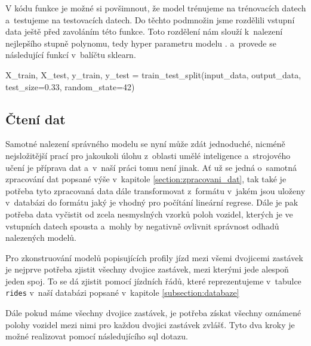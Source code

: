 \bigbreak

V kódu funkce je možné si povšimnout, že model trénujeme na trénovacích datech a~testujeme na testovacích datech. Do těchto podmnožin jsme rozdělili vstupní data ještě před zavoláním této funkce. Toto rozdělení nám slouží k~nalezení nejlepšího stupně polynomu, tedy hyper parametru modelu \citep[viz][Strana 365, validation set a~training set]{Ripley96}. a~provede se následující funkcí v~balíčtu sklearn.

\begin{code}[frame=none]
X_train, X_test, y_train, y_test =
  train_test_split(input_data,
    output_data, test_size=0.33, random_state=42)
\end{code}


\subsection{Čtení dat} \label{subsection:cteni_dat}

Samotné nalezení správného modelu se nyní může zdát jednoduché, nicméně nejsložitější prací pro jakoukoli úlohu z~oblasti umělé inteligence a~strojového učení je příprava dat a~v~naší práci tomu není jinak. Ať už se jedná o~samotná zpracování dat popsané výše v~kapitole \ref{section:zpracovani_dat}, tak také je potřeba tyto zpracovaná data dále transformovat z~formátu v~jakém jsou uloženy v~databázi do formátu jaký je vhodný pro počítání lineární regrese. Dále je pak potřeba data vyčistit od zcela nesmyslných vzorků poloh vozidel, kterých je ve vstupních datech spousta a~mohly by negativně ovlivnit správnost odhadů nalezených modelů.

\bigbreak

Pro zkonstruování modelů popisujících profily jízd mezi všemi dvojicemi zastávek je nejprve potřeba zjistit všechny dvojice zastávek, mezi kterými jede alespoň jeden spoj. To se dá zjistit pomocí jízdních řádů, které reprezentujeme v~tabulce \verb-rides- v~naší databázi popsané v~kapitole \ref{subsection:databaze}


\bigbreak


 Dále pokud máme všechny dvojice zastávek, je potřeba získat všechny oznámené polohy vozidel mezi nimi pro každou dvojici zastávek zvlášť. Tyto dva kroky je možné realizovat pomocí následujícího \gls{sql} dotazu.


